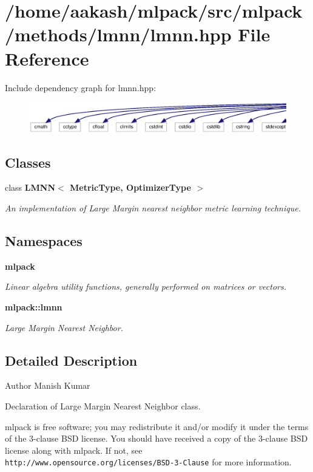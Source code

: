 \section{/home/aakash/mlpack/src/mlpack/methods/lmnn/lmnn.hpp File Reference}
\label{lmnn_8hpp}
Include dependency graph for lmnn.\+hpp\+:
\nopagebreak
\begin{figure}[H]
\begin{center}
\leavevmode
\includegraphics[width=350pt]{lmnn_8hpp__incl}
\end{center}
\end{figure}
\subsection*{Classes}
\begin{DoxyCompactItemize}
\item 
class \textbf{ L\+M\+N\+N$<$ Metric\+Type, Optimizer\+Type $>$}
\begin{DoxyCompactList}\small\item\em An implementation of Large Margin nearest neighbor metric learning technique. \end{DoxyCompactList}\end{DoxyCompactItemize}
\subsection*{Namespaces}
\begin{DoxyCompactItemize}
\item 
 \textbf{ mlpack}
\begin{DoxyCompactList}\small\item\em Linear algebra utility functions, generally performed on matrices or vectors. \end{DoxyCompactList}\item 
 \textbf{ mlpack\+::lmnn}
\begin{DoxyCompactList}\small\item\em Large Margin Nearest Neighbor. \end{DoxyCompactList}\end{DoxyCompactItemize}


\subsection{Detailed Description}
\begin{DoxyAuthor}{Author}
Manish Kumar
\end{DoxyAuthor}
Declaration of Large Margin Nearest Neighbor class.

mlpack is free software; you may redistribute it and/or modify it under the terms of the 3-\/clause B\+SD license. You should have received a copy of the 3-\/clause B\+SD license along with mlpack. If not, see {\tt http\+://www.\+opensource.\+org/licenses/\+B\+S\+D-\/3-\/\+Clause} for more information. 